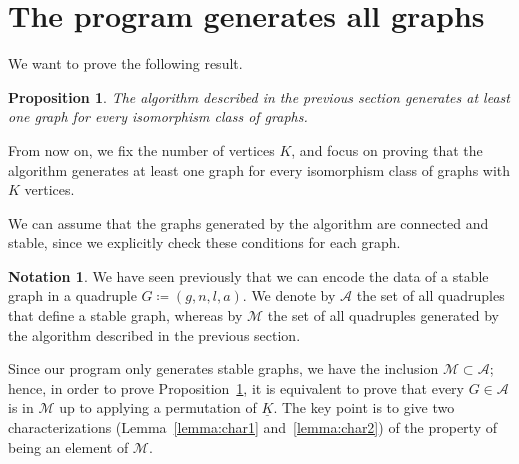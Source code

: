 \documentclass{amsart}
\theoremstyle{plain}
\newtheorem{proposition}[theorem]{Proposition}
\theoremstyle{definition}
\newtheorem{notation}[theorem]{Notation}
\newcommand{\ubar}[1]{\underline{#1}}
\begin{document}
\section{The program generates all graphs}\label{sec:proof}

We want to prove the following result.

\begin{proposition}\label{prop:main}
  The algorithm described in the previous section generates at least
  one graph for every isomorphism class of graphs.
\end{proposition}

From now on, we fix the number of vertices $K$, and focus on proving
that the algorithm generates at least one graph for every isomorphism
class of graphs with $K$ vertices.

We can assume that the graphs generated by the algorithm are connected
and stable, since we explicitly check these conditions for each graph.


\begin{notation}
  We have seen previously that we can encode the data of a stable
  graph in a quadruple $G \coloneqq (g, n, l, a)$. We denote by
  $\mathcal{A}$ the set of all quadruples that define a stable graph,
  whereas by $\mathcal{M}$ the set of all quadruples generated by the
  algorithm described in the previous section.
\end{notation}

Since our program only generates stable graphs, we have the inclusion
$\mathcal{M} \subset \mathcal{A}$; hence, in order to prove
Proposition~\ref{prop:main}, it is equivalent to prove that every $G
\in \mathcal{A}$ is in $\mathcal{M}$ up to applying a permutation of
$\ubar{K}$. The key point is to give two characterizations
(Lemma~\ref{lemma:char1} and~\ref{lemma:char2}) of the property of
being an element of $\mathcal{M}$.
\end{document}

